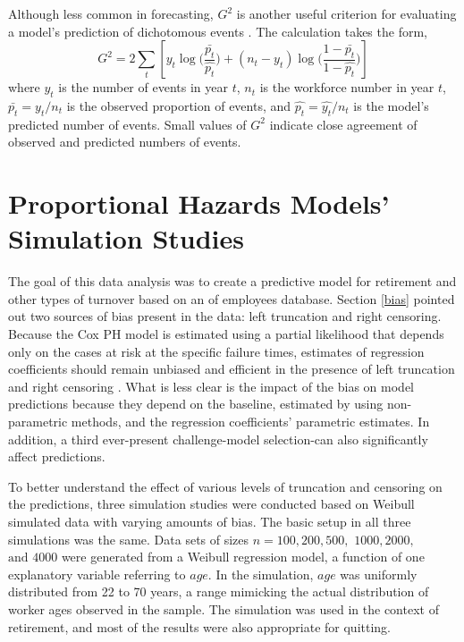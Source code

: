 Although less common in forecasting, $G^2$ is another useful criterion for evaluating a model's prediction of dichotomous events \citep{Simonoff2013}. The calculation takes the form,
\begin{equation}
\label{eq:g2}
G^2=2\sum_{t}[y_t\log{(\frac{\bar{p_t}}{\hat{p_t}}})+ (n_t-y_t)\log{(\frac{1-\bar{p_t}}{1-\hat{p_t}}})]
\end{equation}
where $y_t$ is the number of events in year $t$, $n_t$ is the workforce number in year $t$, $\bar{p_t}={y_t}/{n_t}$ is the observed proportion of events, and $\hat{p_t}={\hat{y_t}}/{n_t} $ is the model's predicted number of events.  Small values of $G^2$ indicate close agreement of observed and predicted numbers of events.

\section{Proportional Hazards Models' Simulation Studies}
The goal of this data analysis was to create a predictive model for retirement and other types of turnover based on an of employees database. Section \ref{bias} pointed out two sources of bias present in the data: left truncation and right censoring.  Because the Cox PH model is estimated using a partial likelihood that depends only on the cases at risk at the specific failure times, estimates of regression coefficients should remain unbiased and efficient in the presence of left truncation and right censoring \citep{Harrell2002}. What is less clear is the impact of the bias on model predictions because  they depend on the baseline, estimated by using non-parametric methods, and the regression coefficients' parametric estimates. In addition, a third ever-present challenge-model selection-can also significantly affect predictions.
 
To better understand the effect of various levels of truncation and censoring on the predictions, three simulation studies were conducted based on Weibull simulated data with varying amounts of bias. The basic setup in all three simulations was the same. Data sets of sizes $n =100, 200, 500,$ $1000, 2000,$ $\text{and } 4000$ were generated from a Weibull regression model, a function of one explanatory variable referring to $age$. In the simulation, $age$ was uniformly distributed from 22 to 70 years, a range mimicking the actual distribution of worker ages observed in the sample. The simulation was used in the context of retirement, and most of the results were also appropriate for quitting.
 
